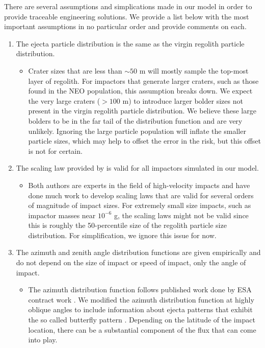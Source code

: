 \documentclass{hitec}
\numberwithin{equation}{section}
\begin{document}
There are several assumptions and simplications made in our model in order to provide traceable engineering solutions. We provide a list below with the most important assumptions in no particular order and provide comments on each.
\begin{enumerate}
	\item The ejecta particle distribution is the same as the virgin regolith particle distribution.
	\begin{itemize}
		\item Crater sizes that are less than $\sim50$ m will mostly sample the top-most layer of regolith. For impactors that generate larger craters, such as those found in the NEO population, this assumption breaks down. We expect the very large craters ($> 100$ m) to introduce larger bolder sizes not present in the virgin regolith particle distribution. We believe these large bolders to be in the far tail of the distribution function and are very unlikely. Ignoring the large particle population will inflate the smaller particle sizes, which may help to offset the error in the risk, but this offset is not for certain.
	\end{itemize}
	\item The scaling law provided by \cite{housen2011ejecta} is valid for all impactors simulated in our model.
	\begin{itemize}
		\item Both authors are experts in the field of high-velocity impacts and have done much work to develop scaling laws that are valid for several orders of magnitude of impact sizes. For extremely small size impacts, such as impactor masses near $10^{-6}$ g, the scaling laws might not be valid since this is roughly the 50-percentile size of the regolith particle size distribution. For simplification, we ignore this issue for now. 
	\end{itemize}
	\item The azimuth and zenith angle distribution functions are given empirically and do not depend on the size of impact or speed of impact, only the angle of impact.
	\begin{itemize}
		\item The azimuth distribution function follows published work done by ESA contract work \citep{ESABASE2_DebrisRelease10.0}. We modified the azimuth distribution function at highly oblique angles to include information about ejecta patterns that exhibit the so called butterfly pattern \citep{shuvalov2011ejecta}. Depending on the latitude of the impact location, there can be a substantial component of the flux that can come into play.

\end{itemize}
\end{enumerate}
\end{document}
